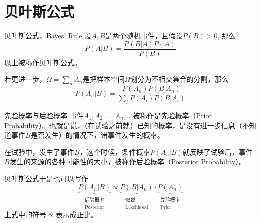 \documentclass[10pt]{beamer}
\begin{document}

\section{贝叶斯公式}


\begin{frame}

\begin{block}{贝叶斯公式，Bayes' Rule}
设$A,B$是两个随机事件，且假设$P(B) > 0$, 那么
$$P(A|B) = \dfrac{P(B|A)P(A)}{P(B)}$$
以上被称作贝叶斯公式。

\vspace{1em}
\pause

若更进一步，$\Omega = \sum\limits_n A_n$是把样本空间$\Omega$划分为不相交集合的分割，那么
$$P(A_n|B) = \dfrac{P(A_n)P(B|A_n)}{\sum\limits_i P(A_i)P(B|A_i)}$$
\end{block}

\end{frame}


\begin{frame}

\begin{block}{先验概率与后验概率}
事件$A_1,A_2,\ldots,A_n,\ldots$被称作是先验概率（Prior Probability）。也就是说，（在试验之前就）已知的概率，是没有进一步信息（不知道事件$B$是否发生）的情况下，诸事件发生的概率。

\vspace{1em}

在试验中，发生了事件$B$，这个时候，条件概率$P(A_n|B)$就反映了试验后，事件$B$发生的来源的各种可能性的大小，被称作后验概率（Posterior Probability）。
\end{block}

\vspace{1em}
\pause

贝叶斯公式于是也可以写作
$$\underbrace{P(A_n|B)}_{\substack{\text{后验概率} \\ \text{Posterior}}} \propto \underbrace{P(B|A_n)}_{\substack{\text{似然} \\ \text{Likelihood}}} \cdot \underbrace{P(A_n)}_{\substack{\text{先验概率} \\ \text{Prior}}}$$
上式中的符号$\propto$表示成正比。

\end{frame}
\end{document}
